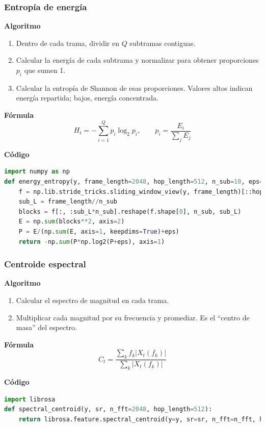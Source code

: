 \subsubsection{Entropía de energía}
\textbf{Algoritmo} \parencite{peeters2004large, giannakopoulos2014intro}
\begin{enumerate}
    \item Dentro de cada trama, dividir en \(Q\) subtramas contiguas.
    \item Calcular la energía de cada subtrama y normalizar para obtener proporciones \(p_i\) que sumen 1.
    \item Calcular la entropía de Shannon de esas proporciones. Valores altos indican energía repartida; bajos, energía concentrada.
\end{enumerate}

\textbf{Fórmula}
\[
H_t=-\sum_{i=1}^{Q}p_i\log_2 p_i,\qquad p_i=\frac{E_i}{\sum_j E_j}
\]

\textbf{Código}
\begin{lstlisting}[language=Python, label={lst:entropy_energy_code}, caption={Entropía de energía}]
import numpy as np
def energy_entropy(y, frame_length=2048, hop_length=512, n_sub=10, eps=1e-10):
    f = np.lib.stride_tricks.sliding_window_view(y, frame_length)[::hop_length]
    sub_L = frame_length//n_sub
    blocks = f[:, :sub_L*n_sub].reshape(f.shape[0], n_sub, sub_L)
    E = np.sum(blocks**2, axis=2)
    P = E/(np.sum(E, axis=1, keepdims=True)+eps)
    return -np.sum(P*np.log2(P+eps), axis=1)
\end{lstlisting}

\subsubsection{Centroide espectral}
\textbf{Algoritmo} \parencite{tzanetakis2002musical, muller2015fmp}
\begin{enumerate}
    \item Calcular el espectro de magnitud en cada trama.
    \item Multiplicar cada magnitud por su frecuencia y promediar. Es el “centro de masa” del espectro.
\end{enumerate}

\textbf{Fórmula}
\[
C_t=\frac{\sum_{k} f_k |X_t(f_k)|}{\sum_{k}|X_t(f_k)|}
\]

\textbf{Código}
\begin{lstlisting}[language=Python, label={lst:centroid_code}, caption={Centroide espectral}]
import librosa
def spectral_centroid(y, sr, n_fft=2048, hop_length=512):
    return librosa.feature.spectral_centroid(y=y, sr=sr, n_fft=n_fft, hop_length=hop_length)[0]
\end{lstlisting}

